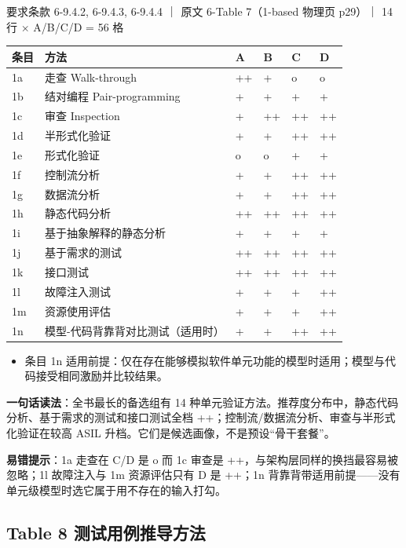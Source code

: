 要求条款 6-9.4.2, 6-9.4.3, 6-9.4.4 ｜ 原文 6-Table 7（1-based 物理页 p29）｜ 14 行 \(\times\) A/B/C/D = 56 格

\begingroup\small
\setlength{\tabcolsep}{4pt}
\begin{xltabular}{\linewidth}{@{}XXXXXX@{}}
\toprule
条目 & 方法 & A & B & C & D \\
\midrule
\endhead
1a & 走查 Walk-through & ++ & + & o & o \\
1b & 结对编程 Pair-programming & + & + & + & + \\
1c & 审查 Inspection & + & ++ & ++ & ++ \\
1d & 半形式化验证 & + & + & ++ & ++ \\
1e & 形式化验证 & o & o & + & + \\
1f & 控制流分析 & + & + & ++ & ++ \\
1g & 数据流分析 & + & + & ++ & ++ \\
1h & 静态代码分析 & ++ & ++ & ++ & ++ \\
1i & 基于抽象解释的静态分析 & + & + & + & + \\
1j & 基于需求的测试 & ++ & ++ & ++ & ++ \\
1k & 接口测试 & ++ & ++ & ++ & ++ \\
1l & 故障注入测试 & + & + & + & ++ \\
1m & 资源使用评估 & + & + & + & ++ \\
1n & 模型-代码背靠背对比测试（适用时） & + & + & ++ & ++ \\
\bottomrule
\end{xltabular}
\endgroup

\begin{itemize}
\item 条目 1n 适用前提：仅在存在能够模拟软件单元功能的模型时适用；模型与代码接受相同激励并比较结果。
\end{itemize}

\textbf{一句话读法}：全书最长的备选组有 14 种单元验证方法。推荐度分布中，静态代码分析、基于需求的测试和接口测试全档 ++；控制流/数据流分析、审查与半形式化验证在较高 ASIL 升档。它们是候选画像，不是预设“骨干套餐”。

\textbf{易错提示}：1a 走查在 C/D 是 o 而 1c 审查是 ++，与架构层同样的换挡最容易被忽略；1l 故障注入与 1m 资源评估只有 D 是 ++；1n 背靠背带适用前提——没有单元级模型时选它属于用不存在的输入打勾。

\subsection{Table 8 测试用例推导方法}

